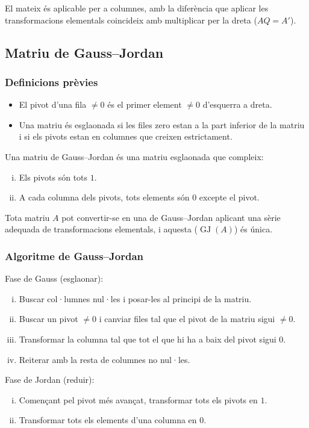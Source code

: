 El mateix és aplicable per a columnes, amb la diferència que aplicar les transformacions elementals coincideix amb multiplicar per la dreta ($AQ = A'$).

\subsection{Matriu de Gauss--Jordan}
\subsubsection*{Definicions prèvies}
\begin{itemize}
    \item El pivot d'una fila $\neq 0$ és el primer element $\neq 0$ d'esquerra a dreta.
    \item Una matriu és esglaonada si les files zero estan a la part inferior de la matriu i si els pivots estan en columnes que creixen estrictament.
\end{itemize}
Una matriu de Gauss--Jordan és una matriu esglaonada que compleix:
\begin{enumerate}[i)]
    \item Els pivots són tots $1$.
    \item A cada columna dels pivots, tots elements són $0$ excepte el pivot.
\end{enumerate}
Tota matriu $A$ pot convertir-se en una de Gauss--Jordan aplicant una sèrie adequada de transformacions elementals, i aquesta ($\operatorname{GJ} (A)$) és única.

\subsubsection*{Algoritme de Gauss--Jordan}
Fase de Gauss (esglaonar):
\begin{enumerate}[i)]
    \item Buscar col·lumnes nul·les i posar-les al principi de la matriu.
    \item Buscar un pivot $\neq 0$ i canviar files tal que el pivot de la matriu sigui $\neq 0$.
    \item Transformar la columna tal que tot el que hi ha a baix del pivot sigui $0$.
    \item Reiterar amb la resta de columnes no nul·les.
\end{enumerate}
Fase de Jordan (reduir):
\begin{enumerate}[i)]
    \item Començant pel pivot més avançat, transformar tots els pivots en $1$.
    \item Transformar tots els elements d'una columna en $0$. 
\end{enumerate}

